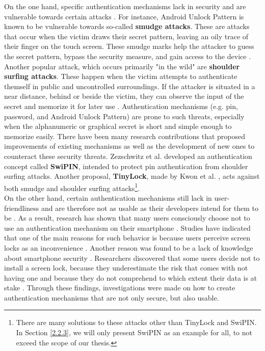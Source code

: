 On the one hand, specific authentication mechanisms lack in security and are vulnerable towards certain attacks \cite{Schloeglhofer}. For instance, Android Unlock Pattern is known to be vulnerable towards so-called \textbf{smudge attacks}. These are attacks that occur when the victim draws their secret pattern, leaving an oily trace of their finger on the touch screen. These smudge marks help the attacker to guess the secret pattern, bypass the security measure, and gain access to the device \cite{ediss20251}. Another popular attack, which occurs primarily "in the wild" are \textbf{shoulder surfing attacks}. These happen when the victim attempts to authenticate themself in public and uncontrolled surroundings. If the attacker is situated in a near distance, behind or beside the victim, they can observe the input of the secret and memorize it for later use \cite{ediss20251}. Authentication mechanisms (e.g. pin, password, and Android Unlock Pattern) are prone to such threats, especially when the alphanumeric or graphical secret is short and simple enough to memorize easily. There have been many research contributions that proposed improvements of existing mechanisms as well as the development of new ones to counteract these security threats. Zezschwitz et al. \cite{vonZezschwitz:2015:SFS:2702123.2702212} developed an authentication concept called \textbf{SwiPIN}, intended to protect pin authentication from shoulder surfing attacks. Another proposal, \textbf{TinyLock}, made by Kwon et al. \cite{kwon}, acts against both smudge and shoulder surfing attacks\footnote{There are many solutions to these attacks other than TinyLock and SwiPIN. In Section \ref{2.2.3}, we will only present SwiPIN as an example for all, to not exceed the scope of our thesis.}.\\

On the other hand, certain authentication mechanisms still lack in user-friendliness and are therefore not as usable as their developers intend for them to be \cite{Schloeglhofer}. As a result, research has shown that many users consciously choose not to use an authentication mechanism on their smartphone \cite{ediss20251, Albayram:2017:BUL:3235924.3235929, Egelman:2014:YRL:2660267.2660273}. Studies have indicated that one of the main reasons for such behavior is because users perceive screen locks as an inconvenience \cite{Albayram:2017:BUL:3235924.3235929, ediss20251, harbach}. Another reason was found to be a lack of knowledge about smartphone security \cite{Albayram:2017:BUL:3235924.3235929, Adams:1999:UE:322796.322806}. Researchers discovered that some users decide not to install a screen lock, because they underestimate the risk that comes with not having one and because they do not comprehend to which extent their data is at stake \cite{Egelman:2014:YRL:2660267.2660273}. Through these findings, investigations were made on how to create authentication mechanisms that are not only secure, but also usable.

